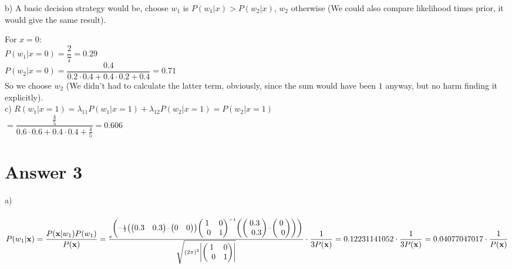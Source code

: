 \documentclass[12pt]{article}
\begin{document}
b)  A basic decision strategy would be, choose $w_1$ is $P(w_1|x)>P(w_2|x)$, $w_2$ otherwise (We could also compare likelihood times prior, it would give the same result).

For $x=0$:\\

$P(w_1|x=0) = \dfrac{2}{7}= 0.29$ \\

$P(w_2|x=0)  = \dfrac{0.4}{0.2\cdot 0.4 + 0.4\cdot 0.2 +0.4} = 0.71 $ \\

So we choose $w_2$ (We didn't had to calculate the latter term, obviously, since the sum would have been $1$ anyway, but no harm finding it explicitly). \\

c)  $R(w_1|x=1) = \lambda_{11}P(w_1|x=1) + \lambda_{12}P(w_2|x=1) = P(w_2|x=1) $\\

$ = \dfrac{\frac{4}{5}}{0.6\cdot 0.6 + 0.4\cdot 0.4+\frac{4}{5}} = 0.606 $\\




\section*{Answer 3}
a)\\\\

$P(w_1|\bold{x}) = \dfrac{P(\bold{x}|w_1)P(w_1)}{P(\bold{x}) }  = \frac{e^{\left(-\frac{1}{2}\left(\begin{pmatrix}0.3&0.3\end{pmatrix}-\begin{pmatrix}0&0\end{pmatrix}\right)\begin{pmatrix}1&0\\ \:\:0&1\end{pmatrix}^{-1}\left(\begin{pmatrix}0.3\\ \:\:0.3\end{pmatrix}-\begin{pmatrix}0\\ \:\:0\end{pmatrix}\right)\right)}}{\sqrt{\left(2\pi \right)^2\left|\begin{pmatrix}1&0\\ \:\:0&1\end{pmatrix}\right|}} \cdot \dfrac{1}{3P(\bold{x})} = 0.12231141052 \cdot \dfrac{1}{3P(\bold{x})} = 0.04077047017 \cdot \dfrac{1}{P(\bold{x})}  $ \\\\\\
\end{document}

